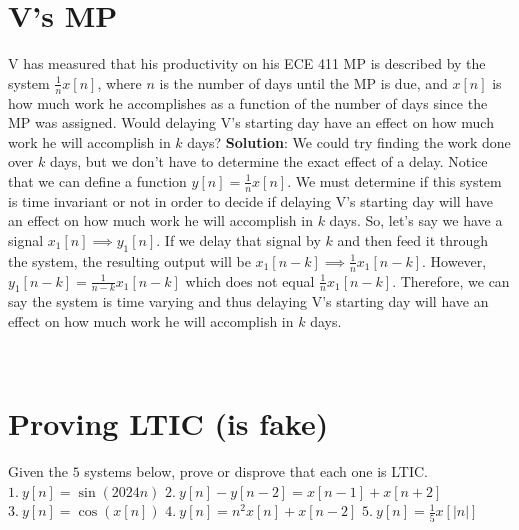 \documentclass{article}
\begin{document}
\section{V's MP}
V has measured that his productivity on his ECE 411 MP is described by the system $\frac{1}{n} x[n]$, where $n$ is the number of days until the MP is due, and $x[n]$ is how much work he accomplishes as a function of the number of days since the MP was assigned. Would delaying V's starting day have an effect on how much work he will accomplish in $k$ days?
\newline
\newline
\noindent \textbf{Solution}: We could try finding the work done over $k$ days, but we don't have to determine the exact effect of a delay. Notice that we can define a function $y[n] = \frac{1}{n} x[n]$. We must determine if this system is time invariant or not in order to decide if delaying V's starting day will have an effect on how much work he will accomplish in $k$ days. 
\newline
\newline
So, let's say we have a signal $x_1[n]\implies y_1[n]$. If we delay that signal by $k$ and then feed it through the system, the resulting output will be $x_1[n-k]\implies \frac{1}{n}x_1[n-k]$. However, $y_1[n-k]=\frac{1}{n-k}x_1[n-k]$ which does not equal $\frac{1}{n}x_1[n-k]$. Therefore, we can say the system is time varying and thus delaying V's starting day will have an effect on how much work he will accomplish in $k$ days.


\

\newpage

\section{Proving LTIC (is fake)}
Given the $5$ systems below, prove or disprove that each one is LTIC.
\newline
\newline
\indent
$1. \ y[n]=\sin(2024n)$
\newline
\newline
\indent
$2. \ y[n]-y[n-2]=x[n-1]+x[n+2]$
\newline
\newline
\indent
$3. \ y[n]=\cos(x[n])$
\newline
\newline
\indent
$4. \ y[n]= n^2x[n] + x[n-2]$
\newline
\newline
\indent
$5. \ y[n]=\frac{1}{5}x[|n|]$
\end{document}
